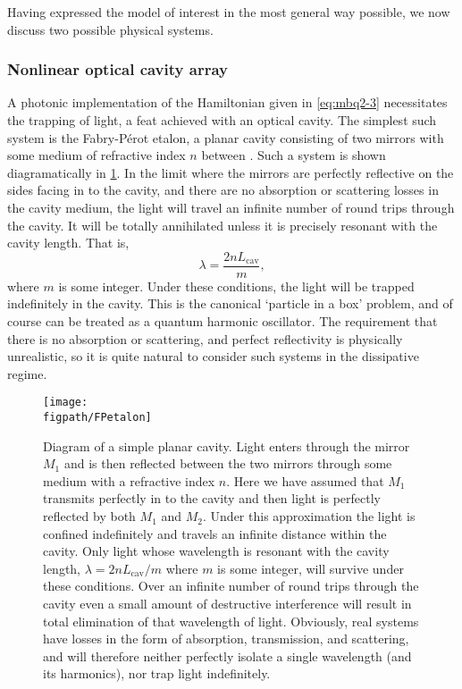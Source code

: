 Having expressed the model of interest in the most general way possible, we now discuss two possible physical systems.

\subsubsection{Nonlinear optical cavity array}
A photonic implementation of the Hamiltonian given in \cref{eq:mbq2-3} necessitates the trapping of light, a feat achieved with an optical cavity. The simplest such system is the Fabry-P\'{e}rot etalon, a planar cavity consisting of two mirrors with some medium of refractive index \(n\) between \cite{Perot1899,Fox_OC}. Such a system is shown diagramatically in \cref{fig:mbq2-1}. In the limit where the mirrors are perfectly reflective on the sides facing in to the cavity, and there are no absorption or scattering losses in the cavity medium, the light will travel an infinite number of round trips through the cavity. It will be totally annihilated unless it is precisely resonant with the cavity length. That is,
\begin{equation}
	\lambda = \frac{2nL_{\mathrm{cav}}}{m},
	\label{eq:mbq2-4}
\end{equation}
where \(m\) is some integer. Under these conditions, the light will be trapped indefinitely in the cavity. This is the canonical `particle in a box' problem, and of course can be treated as a quantum harmonic oscillator. The requirement that there is no absorption or scattering, and perfect reflectivity is physically unrealistic, so it is quite natural to consider such systems in the dissipative regime.

\begin{figure}[ht!]
\centering
\texttt{[image: \\figpath/FPetalon]}
\caption{Diagram of a simple planar cavity. Light enters through the mirror \(M_{1}\) and is then reflected between the two mirrors through some medium with a refractive index \(n\). Here we have assumed that \(M_{1}\) transmits perfectly in to the cavity and then light is perfectly reflected by both \(M_{1}\) and \(M_{2}\). Under this approximation the light is confined indefinitely and travels an infinite distance within the cavity. Only light whose wavelength is resonant with the cavity length, \(\lambda = 2nL_{\mathrm{cav}} / m\) where \(m\) is some integer, will survive under these conditions. Over an infinite number of round trips through the cavity even a small amount of destructive interference will result in total elimination of that wavelength of light. Obviously, real systems have losses in the form of absorption, transmission, and scattering, and will therefore neither perfectly isolate a single wavelength (and its harmonics), nor trap light indefinitely.}
\label{fig:mbq2-1}
\end{figure}

